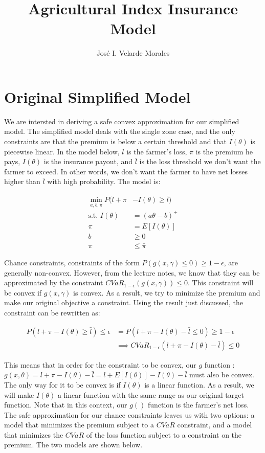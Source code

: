 \documentclass[11pt]{article}
\title{Agricultural Index Insurance Model}
\author{José I. Velarde Morales}
\begin{document}
\maketitle

\section{Original Simplified Model}
We are intersted in deriving a safe convex approximation for our simplified model. The simplified model deals with the single zone case, and the only constraints are that the premium is below a certain threshold and that $I(\theta)$ is piecewise linear. In the model below, $l$ is the farmer's loss, $\pi$ is the premium he pays, $I(\theta)$ is the insurance payout, and $\bar{l}$ is the loss threshold we don't want the farmer to exceed. In other words, we don't want the farmer to have net losses higher than $\bar{l}$ with high probability. The model is:

\begin{align}
    \min_{a,b,\pi} P(l + \pi &-I(\theta) \geq \bar{l})\\
    \text{s.t.   } I(\theta) &= (a\theta - b)^+\\
    \pi &= E[I(\theta)]\\
    b &\geq 0\\
    \pi &\leq \bar{\pi}
\end{align}

Chance constraints, constraints of the form $P(g(x,\gamma) \leq 0)\geq 1-\epsilon$, are generally non-convex. However, from the lecture notes, we know that they can be approximated by the constraint $CVaR_{1-\epsilon}(g(x,\gamma))\leq 0$. This constraint will be convex if $g(x,\gamma)$ is convex. As a result, we try to minimize the premium and make our original objective a constraint. Using the result just discussed, the constraint can be rewritten as:

\begin{align*}
    P(l+\pi-I(\theta) \geq \bar{l}) \leq \epsilon &= P(l+\pi-I(\theta) - \bar{l} \leq 0) \geq 1-\epsilon \\
    &\implies CVaR_{1-\epsilon}(l+\pi -I(\theta)-\bar{l}) \leq 0
\end{align*}

This means that in order for the constraint to be convex, our $g$ function : $g(x,\theta) = l+\pi -I(\theta) -\bar{l} = l+E[I(\theta)] -I(\theta) - \bar{l}$ must also be convex. The only way for it to be convex is if $I(\theta)$ is a linear function. As a result, we will make $I(\theta)$ a linear function with the same range as our original target function. Note that in this context, our $g()$ function is the farmer's net loss. The safe approximation for our chance constraints leaves us with two options: a model that minimizes the premium subject to a $CVaR$ constraint, and a model that minimizes the $CVaR$ of the loss function subject to a constraint on the premium. The two models are shown below. 
\end{document}
